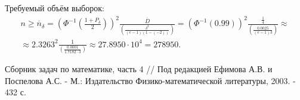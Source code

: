 \documentclass[a4paper,12pt]{article}
\begin{document}
Требуемый объём выборок:
\begin{multline*}
    n
    \ge \overline{n}_\delta
    = \left( \Phi^{-1} \left( \frac{1 + P_\delta}{2} \right) \right)^2 \frac{\overline{D}}{\left( \frac{\delta^2}{(e-1)(1-(-2))} \right)}
    = \left( \Phi^{-1} ( 0.99 ) \right)^2 \frac{\frac{1}{4}}{\left( \frac{0.0025}{(e-1) 3} \right)} \approx \\
    \approx 2.3263^2 \frac{1}{\left( \frac{0.0001}{1.7182 \cdot 3} \right)}
    \approx 27.8950 \cdot 10^4
    = 278 950 .
\end{multline*}

\fi

\begin{thebibliography}{1}
     Сборник задач по математике, часть 4 // Под редакцией Ефимова А.В. и Поспелова А.С. - М.: Издательство Физико-математической
    литературы, 2003. - 432 с.
\end{thebibliography}
\end{document}
